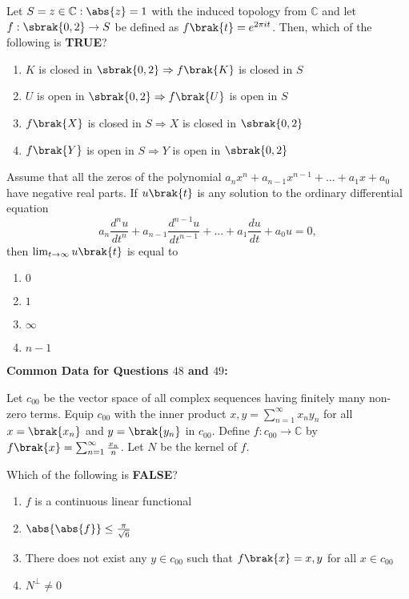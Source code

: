     \item Let $S = {z \in \mathbb{C} : \abs{z} = 1}$ with the induced topology from $\mathbb{C}$ and let $f: \sbrak{0, 2} \rightarrow S$ be defined as $f \brak{t} = e^{2 \pi i t}$. Then, which of the following is \textbf{TRUE}?
    \begin{enumerate}
        \item $K$ is closed in $\sbrak{0, 2} \Rightarrow f \brak{K}$ is closed in $S$
        \item $U$ is open in $\sbrak{0, 2} \Rightarrow f \brak{U}$ is open in $S$
        \item $f \brak{X}$ is closed in $S \Rightarrow X$ is closed in $\sbrak{0, 2}$
        \item $f \brak{Y}$ is open in $S \Rightarrow Y$ is open in $\sbrak{0, 2}$
    \end{enumerate}

    \item Assume that all the zeros of the polynomial $a_n x^n + a_{n-1} x^{n-1} + \dots + a_1 x + a_0$ have negative real parts. If $u \brak{t}$ is any solution to the ordinary differential equation
    \[
    a_n \frac{d^n u}{d t^n} + a_{n-1} \frac{d^{n-1} u}{d t^{n-1}} + \dots + a_1 \frac{d u}{d t} + a_0 u = 0,
    \]
    then $\lim_{t \to \infty} u \brak{t}$ is equal to
    \begin{enumerate}
        \item $0$
        \item $1$
        \item $\infty$
        \item $n - 1$
    \end{enumerate}

\textbf{Common Data for Questions $48$ and $49$:}

    Let $c_{00}$ be the vector space of all complex sequences having finitely many non-zero terms. Equip $c_{00}$ with the inner product ${x, y} = \sum_{n = 1}^{\infty} x_n y_n$ for all $x = \brak{x_n}$ and $y = \brak{y_n}$ in $c_{00}$. Define $f: c_{00} \rightarrow \mathbb{C}$ by $f \brak{x} = \sum_{n=1}^{\infty} \frac{x_n}{n}$. Let $N$ be the kernel of $f$.

    \item Which of the following is \textbf{FALSE}?
    \begin{enumerate}
        \item $f$ is a continuous linear functional
        \item $\abs{\abs{f}} \leq \frac{\pi}{\sqrt{6}}$
        \item There does not exist any $y \in c_{00}$ such that $f \brak{x} = {x, y}$ for all $x \in c_{00}$
        \item $N^{\perp} \neq {0}$
    \end{enumerate}

